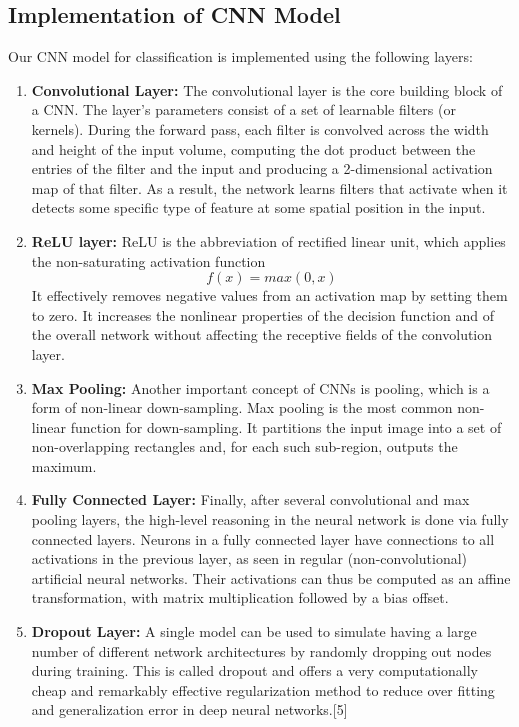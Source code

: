 \documentclass[12pt]{article}
\begin{document}
\subsection{Implementation of CNN Model}
\label{sec:model_def}
Our CNN model for classification is implemented using the following layers: 
\begin{enumerate}
	\item {\textbf{Convolutional Layer:}} The convolutional layer is the core building block of a CNN. The layer's parameters consist of a set of learnable filters (or kernels). During the forward pass, each filter is convolved across the width and height of the input volume, computing the dot product between the entries of the filter and the input and producing a 2-dimensional activation map of that filter. As a result, the network learns filters that activate when it detects some specific type of feature at some spatial position in the input.
	
	\item {\textbf{ReLU layer:}} ReLU is the abbreviation of rectified linear unit, which applies the non-saturating activation function 
\begin{equation}	
	f(x)=max(0, x)
\end{equation} It effectively removes negative values from an activation map by setting them to zero. It increases the nonlinear properties of the decision function and of the overall network without affecting the receptive fields of the convolution layer. 

	\item {\textbf{Max Pooling:}} Another important concept of CNNs is pooling, which is a form of non-linear down-sampling. Max pooling is the most common non-linear function for down-sampling. It partitions the input image into a set of non-overlapping rectangles and, for each such sub-region, outputs the maximum. 
	
	\item \textbf{Fully Connected Layer:} Finally, after several convolutional and max pooling layers, the high-level reasoning in the neural network is done via fully connected layers. Neurons in a fully connected layer have connections to all activations in the previous layer, as seen in regular (non-convolutional) artificial neural networks. Their activations can thus be computed as an affine transformation, with matrix multiplication followed by a bias offset. 
	
	\item \textbf{Dropout Layer:} A single model can be used to simulate having a large number of different network architectures by randomly dropping out nodes during training. This is called dropout and offers a very computationally cheap and remarkably effective regularization method to reduce over fitting and generalization error in deep neural networks.[5]

\end{enumerate}
\end{document}
